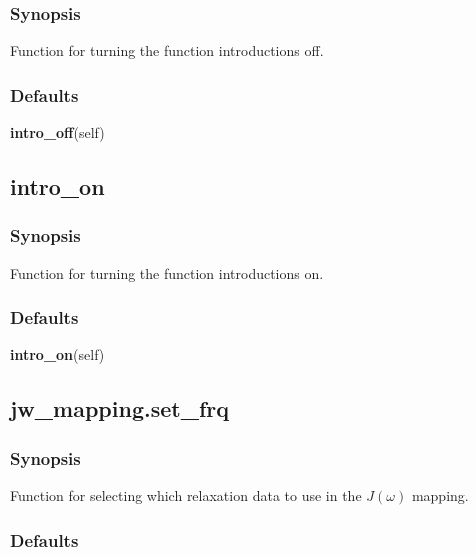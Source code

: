   
 \subsubsection{Synopsis} 

 Function for turning the function introductions off. 
  

  
 \subsubsection{Defaults} 

 \textsf{\textbf{intro\_off}(self)} 

  

 \newpage 

 \subsection{intro\_on} 

  
 \subsubsection{Synopsis} 

 Function for turning the function introductions on. 
  

  
 \subsubsection{Defaults} 

 \textsf{\textbf{intro\_on}(self)} 

  

 \newpage 

 \subsection{jw\_mapping.set\_frq} 

  
 \subsubsection{Synopsis} 

 Function for selecting which relaxation data to use in the $J(\omega)$ mapping. 
  

  
 \subsubsection{Defaults} 

